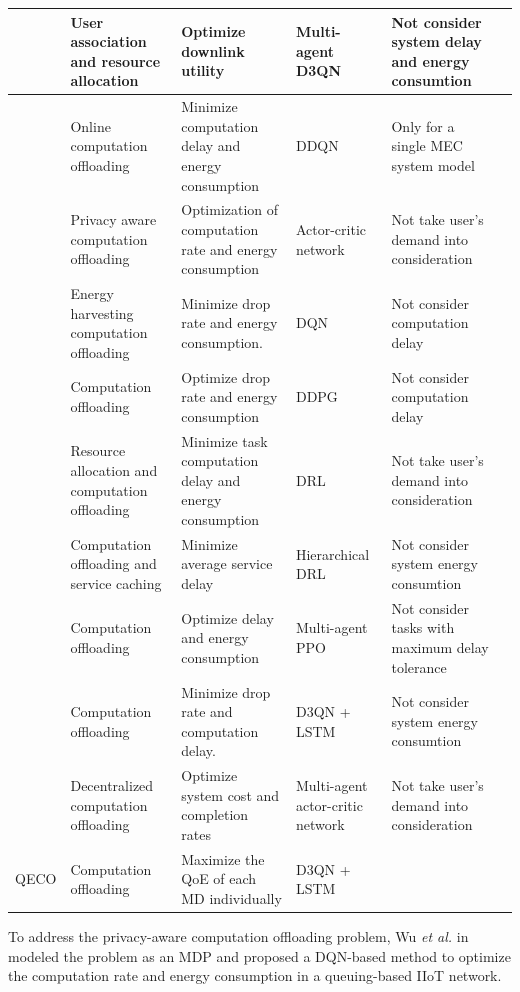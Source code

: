 \documentclass[10pt, journal,letterpaper]{IEEEtran}
\begin{document}
{\begin{table}[htbp]
{{\begin{tabular}{ lp{3cm}p{5.3cm}p{2cm}p{4.8cm}l}
 					\cite{zhao2019deep} & User association and resource allocation & Optimize downlink utility  & Multi-agent D3QN & Not consider system delay and energy consumtion \\\midrule
 					\cite{liao2023online}  & Online computation offloading & Minimize computation delay and energy consumption & DDQN & Only for a single MEC system model  \\\midrule
 					\cite{wu2024combining}   & Privacy aware computation offloading & Optimization of computation rate and energy consumption  & Actor-critic network  & Not take user's demand into consideration \\\midrule
 					\cite{Bolourian-WCL24}  & Energy harvesting  computation offloading & Minimize drop rate and energy consumption.  & DQN & Not consider computation delay  \\\midrule
 					\cite{huang2021deadline}  & Computation offloading & Optimize drop rate and energy consumption & DDPG & Not consider computation delay \\ \midrule
 					\cite{gong2022edge} & Resource allocation and computation offloading & Minimize task computation delay and energy consumption  & DRL & Not take user's demand into consideration\\\midrule
 					\cite{sun2024hierarchical} & Computation offloading and service caching & Minimize average service delay & Hierarchical DRL & Not consider system energy consumtion \\\midrule
 					\cite{wu2023multi}  & Computation offloading & Optimize delay and energy consumption  & Multi-agent PPO&  Not consider tasks with maximum delay tolerance \\\midrule
 					\cite{9253665}  &  Computation offloading & Minimize drop rate and computation delay.  & D3QN + LSTM & Not consider system energy consumtion\\\midrule
 					\cite{gao2022large}  & Decentralized computation offloading & Optimize system cost and completion rates  & Multi-agent actor-critic network& Not take user's demand into consideration \\\midrule
 					QECO  &  Computation offloading & Maximize the QoE of each MD individually & D3QN + LSTM & \\
 					\toprule
 			\end{tabular}}
 			\label{table1}}
 	\end{table}
To address the privacy-aware computation offloading problem, Wu \textit{et al.} in \cite{wu2024combining} modeled the problem as an MDP and proposed a DQN-based method to optimize the computation rate and energy consumption in a queuing-based IIoT network.
}
\end{document}

